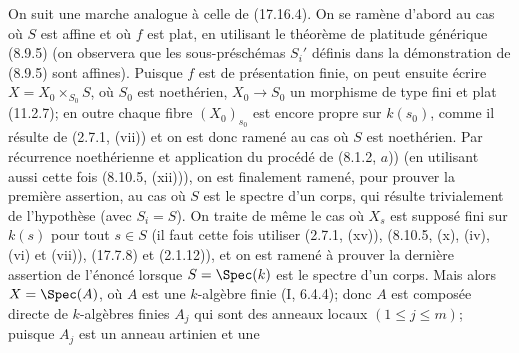 On suit une marche analogue à celle de (17.16.4). On se ramène d'abord au cas où $S$ est affine et où $f$ est plat, en utilisant le théorème de platitude générique (8.9.5) (on observera que les sous-préschémas $S_i'$ définis dans la démonstration de (8.9.5) sont affines). Puisque $f$ est de présentation finie, on peut ensuite écrire $X=X_0\times_{S_0}S$, où $S_0$ est noethérien, $X_0\to S_0$ un morphisme de type fini et plat (11.2.7); en outre chaque fibre $(X_0)_{s_0}$ est encore propre sur $k(s_0)$, comme il résulte de (2.7.1, (vii)) et on est donc ramené au cas où $S$ est noethérien. Par récurrence noethérienne et application du procédé de (8.1.2, $a$)) (en utilisant aussi cette fois (8.10.5, (xii))), on est finalement ramené, pour prouver la première assertion, au cas où $S$ est le spectre d'un corps, qui résulte trivialement de l'hypothèse (avec $S_i=S$). On traite de même le cas où $X_s$ est supposé fini sur $k(s)$ pour tout $s\in S$ (il faut cette fois utiliser (2.7.1, (xv)), (8.10.5, (x), (iv), (vi) et (vii)), (17.7.8) et (2.1.12)), et on est ramené à prouver la dernière assertion de l'énoncé lorsque $S=\Spec(k)$ est le spectre d'un corps. Mais alors $X=\Spec(A)$, où $A$ est une $k$-algèbre finie (I, 6.4.4); donc $A$ est composée directe de $k$-algèbres finies $A_j$ qui sont des anneaux locaux $(1\leq j\leq m)$; puisque $A_j$ est un anneau artinien et une

